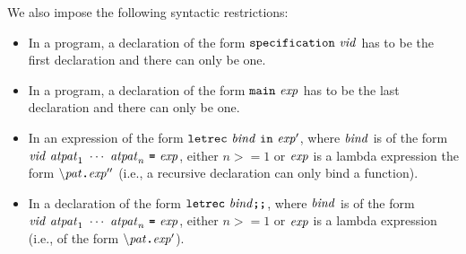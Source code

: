 \documentclass[final]{article}
\begin{document}
We also impose the following syntactic restrictions:
\begin{itemize}
\item In a program, a declaration of the form $\mathtt{specification}\ \mathit{vid}$
  has to be the first declaration and there can only be one.
\item In a program, a declaration of the form $\mathtt{main}\ \mathit{exp}$
  has to be the last declaration and there can only be one.
\item In an expression of the form
  $\mathtt{letrec}\ \mathit{bind}\ \mathtt{in}\ \mathit{exp}'$, where $\mathit{bind}$ is of the
  form
  $\mathit{vid}\ \mathit{atpat}_1\ \cdots\ \mathit{atpat}_n\ \textbf{\texttt{=}}\ \mathit{exp}$,
  either $n>=1$ or $\mathit{exp}$ is a lambda expression the form
  $\textbf{\texttt{$\backslash$}}\mathit{pat}\textbf{\texttt{.}}\mathit{exp}''$ (i.e., a recursive declaration
  can only bind a function).
\item In a declaration of the form $\mathtt{letrec}\ \mathit{bind}\textbf{\texttt{;}}\textbf{\texttt{;}}$, where
  $\mathit{bind}$ is of the form
  $\mathit{vid}\ \mathit{atpat}_1\ \cdots\ \mathit{atpat}_n\ \textbf{\texttt{=}}\ \mathit{exp}$,
  either $n>=1$ or $\mathit{exp}$ is a lambda expression (i.e., of the
  form $\textbf{\texttt{$\backslash$}}\mathit{pat}\textbf{\texttt{.}}\mathit{exp}'$).
\end{itemize}





\printindex
\end{document}

